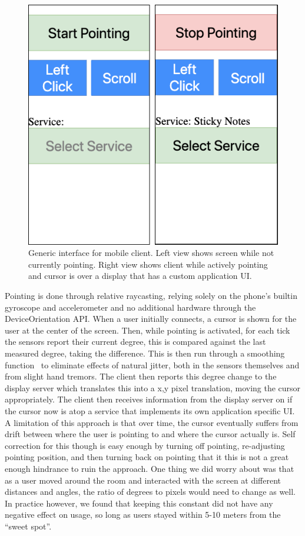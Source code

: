 \begin{figure}
\centering
  \includegraphics[width=0.65\columnwidth]{figures/generic_mobile_client}
  \caption{Generic interface for mobile client. Left view shows
  screen while not currently pointing. Right view shows client
  while actively pointing and cursor is over a display that has a custom application UI.}
  \label{fig:mobile_start_ui}
\end{figure}

Pointing is done through relative raycasting, relying solely
on the phone's builtin gyroscope and accelerometer and no additional
hardware through the DeviceOrientation API. When a user initially
connects, a
cursor is shown for the user at the center of the screen. Then,
while pointing is activated, for each tick the sensors report
their current degree, this is compared against the last measured
degree, taking the difference. This is then run through a smoothing
function~\cite{casiez_1_2012} to eliminate effects of natural
jitter, both in the sensors themselves and from slight hand
tremors. The client then reports this degree change to the display
server which translates this into a x,y pixel translation,
moving the cursor appropriately. The client then receives
information from the display server on if the cursor now is atop
a service that implements its own application specific UI. A
limitation of this approach is that over time, the cursor
eventually suffers from drift between where the user is pointing
to and where the cursor actually is. Self correction for this
though is easy enough by turning off pointing, re-adjusting
pointing position, and then turning back on pointing that it
this is not a great enough hindrance to ruin the approach. One thing
we did worry about was that as a user moved around the room and
interacted with the screen at different distances and angles, the
ratio of
degrees to pixels would need to change as well. In practice however,
we found that keeping this constant did not have any negative
effect on usage, so long as users stayed within 5-10 meters from
the ``sweet spot''.

